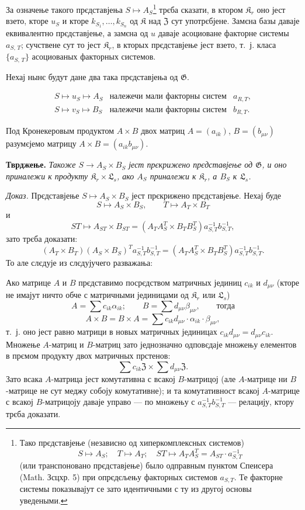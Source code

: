 \documentclass[11pt]{article}
\newcommand{\srcfn}[2]{\footnote{#2}}
\begin{document}
За означење такого прєдставјења \(S\mapsto A_S\)\srcfn{1}{Тако прєдставјење (независно од хиперкомплексных системов)
\[
S\mapsto A_S;\quad T\mapsto A_T;\quad ST\mapsto A_TA_S^T=A_{ST}\cdot a_{S,T}^{-1}
\]
(или транспоновано прєдставјење) было одправным пунктом Спеисера (Math. Зсцхр. 5) при опрєдєљењу факторных системов \(a_{S,T}\). Те факторне системы показывајут се зато идентичными с ту из другој основы уведеными.} трєба сказати, в ктором \(\mathfrak K_r\) оно јест взето, кторе \(u_S\) и кторе \(k_{S_1},\ldots,k_{S_n}\) од \(\mathfrak K\) над \(\mathfrak Z\) сут употрєбјене. Замєна базы даваје еквивалентно прєдставјење, а замєна од \(u\) даваје асоциоване факторне системы \(a_{S,\,T}\); сучствене сут то јест \(\mathfrak K_r\), в кторых прєдставјење јест взето, т.~ј. класа \(\{a_{S,\,T}\}\) асоциованых факторных системов.

Нехај нынє будут дане два така прєдставјења од \(\mathfrak G\).

\[
\begin{array}{lll}
S\mapsto u_S\mapsto A_S & \text{належечи мали факторны систем} & a_{R,T},\\
S\mapsto v_S\mapsto B_S & \text{належечи мали факторны систем} & b_{R,T}.
\end{array}
\]

Под Кронекеровым продуктом \(A\times B\) двох матриц \(A=(a_{ik})\), \(B=(b_{\mu\nu})\) разумєјемо матрицу \(A\times B=(a_{ik}b_{\mu\nu})\).

\noindent\textbf{Тврджење.} \emph{Такоже \(S\to A_S\times B_S\) јест прєкрижено прєдставјење од \(\mathfrak G\), и оно приналежи к продукту \(\mathfrak K_r\times\mathfrak L_s\), ако \(A_S\) приналежи к \(\mathfrak K_r\), а \(B_S\) к \(\mathfrak L_s\).}

\noindent\emph{Доказ.} Прєдставјење \(S\mapsto A_S\times B_S\) јест прєкрижено прєдставјење. Нехај буде
\[
S\mapsto A_S\times B_S,\qquad T\mapsto A_T\times B_T
\]
и
\[
ST\mapsto A_{ST}\times B_{ST}
=(A_TA_S^T\times B_TB_S^T)a_{S,T}^{-1}b_{S,T}^{-1},
\]
зато трєба доказати:
\[
(A_T\times B_T)(A_S\times B_S)^T a_{S,T}^{-1}b_{S,T}^{-1}
=(A_TA_S^T\times B_TB_S^T)a_{S,T}^{-1}b_{S,T}^{-1}.
\]
То але слєдује из слєдујучего разважања:

Ако матрице \(A\) и \(B\) прєдставимо посрєдством матричных јединиц \(c_{ik}\) и \(d_{\mu\nu}\) (кторе не имајут ничто обче с матричными јединицами од \(\mathfrak K_r\) или \(\mathfrak L_s\))
\[
A=\sum c_{ik}\alpha_{ik};\qquad
B=\sum d_{\mu\nu}\beta_{\mu\nu},\qquad\text{тогда}
\]
\[
A\times B=B\times A
=\sum c_{ik}d_{\mu\nu}\cdot\alpha_{ik}\cdot\beta_{\mu\nu},
\]
т.~ј. оно јест равно матрици в новых матричных јединицах
\(c_{ik}d_{\mu\nu}=d_{\mu\nu}c_{ik}\). Множење \(A\)-матриц и \(B\)-матриц зато једнозначно одповєдаје множењу елементов в прємом продукту двох матричных прстенов:
\[
\sum c_{ik}\mathfrak Z\times\sum d_{\mu\nu}\mathfrak Z.
\]
Зато всака \(A\)-матрица јест комутативна с всакој \(B\)-матрицој (але \(A\)-матрице ни \(B\)-матрице не сут меджу собоју комутативне); и та комутативност всакој \(A\)-матрице с всакој \(B\)-матрицоју даваје управо --- по множењу с \(a_{S,T}^{-1}b_{S,T}^{-1}\) --- релацију, ктору трєба доказати.
\end{document}
